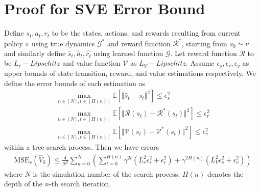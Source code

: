 \section{Proof for SVE Error Bound}
\begin{corollary}
\label{app:theorem:sve_error}
    Define $s_t,a_t,r_t$ to be the states, actions, and rewards resulting from current policy $\pi$ using true dynamics $\mathcal{G}^*$ and reward function $\mathcal{R}^*$, starting from $s_0\sim\nu$ and similarly define $\hat{s}_t, \hat{a}_t, \hat{r_t}$ using learned function $\mathcal{G}$. Let reward function $\mathcal{R}$ to be $L_r-Lipschitz$ and value function $\mathcal{V}$ as $L_V-Lipschitz$. Assume $\epsilon_s, \epsilon_r, \epsilon_v$ as upper bounds of state transition, reward, and value estimations respectively. We define the error bounds of each estimation as
    \begin{gather}
        \max_{n\in[N],t\in[H(n)]}\mathbb{E}\left[\Vert\hat{s}_t-s_t\Vert^2\right]\leq\epsilon_s^2 \\
        \max_{n\in[N],t\in[H(n)]}\mathbb{E}\left[\Vert\mathcal{R}(s_t)-\mathcal{R}^*(s_t)\Vert^2\right]\leq\epsilon_r^2 \\
        \max_{n\in[N],t\in[H(n)]}\mathbb{E}\left[\Vert\mathcal{V}(s_t)-\mathcal{V}^*(s_t)\Vert^2\right]\leq\epsilon_v^2
    \end{gather}
    within a tree-search process. Then we have errors
    \begin{equation}
    \begin{aligned}
        \text{MSE}_\nu(\hat{V}_\text{S})\leq\frac{4}{N^2}\sum_{n=0}^N\left(\sum_{t=0}^{H(n)}\gamma^{2t}(L_r^2\epsilon_s^2+\epsilon_r^2)+\gamma^{2H(n)}(L_V^2\epsilon_s^2+\epsilon_v^2)\right)
    \end{aligned}
    \end{equation}
    where $N$ is the simulation number of the search process. $H(n)$ denotes the depth of the $n$-th search iteration.
\end{corollary}


